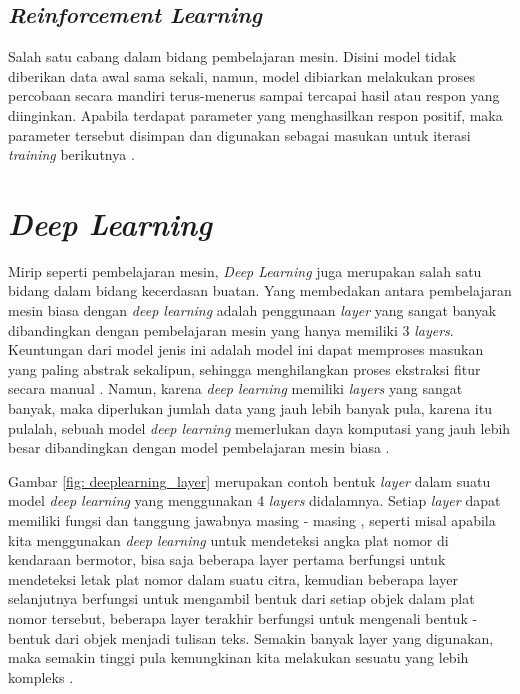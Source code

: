 \subsection{\textit{Reinforcement Learning}}

Salah satu cabang dalam bidang pembelajaran mesin. Disini model tidak diberikan data awal sama sekali, namun, model dibiarkan melakukan proses percobaan secara mandiri terus-menerus sampai tercapai hasil atau respon yang diinginkan. Apabila terdapat parameter yang menghasilkan respon positif, maka parameter tersebut disimpan dan digunakan sebagai masukan untuk iterasi \textit{training} berikutnya \cite{mit_ml_expl}.

\section{\textit{Deep Learning}}

Mirip seperti pembelajaran mesin, \textit{Deep Learning} juga merupakan salah satu bidang dalam bidang kecerdasan buatan. Yang membedakan antara pembelajaran mesin biasa dengan \textit{deep learning} adalah penggunaan \textit{layer} yang sangat banyak dibandingkan dengan pembelajaran mesin yang hanya memiliki 3 \textit{layers}. Keuntungan dari model jenis ini adalah model ini dapat memproses masukan yang paling abstrak sekalipun, sehingga menghilangkan proses ekstraksi fitur secara manual \cite{mathwork_deeplearning}. Namun, karena \textit{deep learning} memiliki \textit{layers} yang sangat banyak, maka diperlukan jumlah data yang jauh lebih banyak pula, karena itu pulalah, sebuah model \textit{deep learning} memerlukan daya komputasi yang jauh lebih besar dibandingkan dengan model pembelajaran mesin biasa \cite{mit_ml_expl}.

Gambar \ref{fig: deeplearning_layer} merupakan contoh bentuk \textit{layer} dalam suatu model \textit{deep learning} yang menggunakan 4 \textit{layers} didalamnya. Setiap \textit{layer} dapat memiliki fungsi dan tanggung jawabnya masing - masing \cite{mit_ml_expl}, seperti misal apabila kita menggunakan \textit{deep learning} untuk mendeteksi angka plat nomor di kendaraan bermotor, bisa saja beberapa layer pertama berfungsi untuk mendeteksi letak plat nomor dalam suatu citra, kemudian beberapa layer selanjutnya berfungsi untuk mengambil bentuk dari setiap objek dalam plat nomor tersebut, beberapa layer terakhir berfungsi untuk mengenali bentuk - bentuk dari objek menjadi tulisan teks. Semakin banyak layer yang digunakan, maka semakin tinggi pula kemungkinan kita melakukan sesuatu yang lebih kompleks \cite{mit_ml_expl}.


